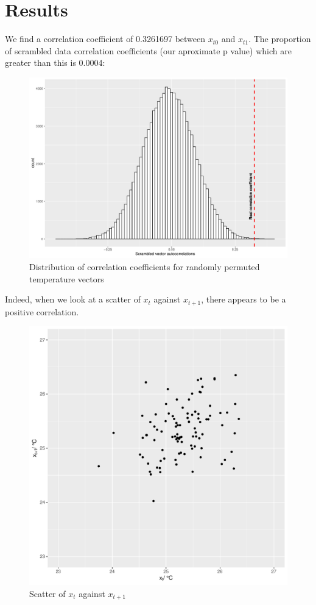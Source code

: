 \documentclass[12pt]{article}
\begin{document}
    \section{Results}

        We find a correlation coefficient of 0.3261697 between $x_{t0}$ and $x_{t1}$. The proportion of scrambled data correlation coefficients (our aproximate p value) which are greater than this is 0.0004:

        \begin{figure}[H]
        \includegraphics[width=\linewidth]{../Results/AutoC.pdf}
        \caption{Distribution of correlation coefficients for randomly permuted temperature vectors}
        \label{fig:corrcoef}
        \end{figure}

        \pagebreak
        \noindent
        Indeed, when we look at a scatter of $x_{t}$ against $x_{t+1}$, there appears to be a positive correlation. 


        \begin{figure}[H]
        \includegraphics[width=\linewidth]{../Results/AutoCscatter.pdf}
        \caption{Scatter of $x_{t}$ against $x_{t+1}$}
        \label{fig:scatter}
        \end{figure}
\end{document}

